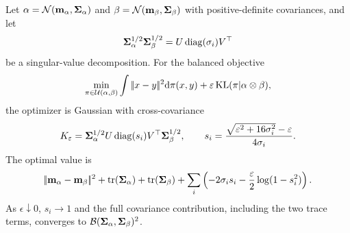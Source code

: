 \begin{prop}\label{prop-gaussian-sinkhorn-closed-form}
	Let $\alpha=\mathcal{N}(\mathbf{m}_\alpha,\mathbf{\Sigma}_\alpha)$ and $\beta=\mathcal{N}(\mathbf{m}_\beta,\mathbf{\Sigma}_\beta)$ with positive-definite covariances, and let
	\[
		\mathbf{\Sigma}_\alpha^{1/2}\mathbf{\Sigma}_\beta^{1/2}
		=
		U\operatorname{diag}(\sigma_i)V^\top
	\]
	be a singular-value decomposition. For the balanced objective
	\[
		\min_{\pi\in\mathcal{U}(\alpha,\beta)}
		\int|\!| x-y |\!|^2\mathrm{d}\pi(x,y)
		+
		\varepsilon\operatorname{KL}(\pi|\alpha\otimes\beta),
	\]
	the optimizer is Gaussian with cross-covariance
	\[
		K_\varepsilon
		=
		\mathbf{\Sigma}_\alpha^{1/2}
		U\operatorname{diag}(s_i)V^\top
		\mathbf{\Sigma}_\beta^{1/2},
		\qquad
		s_i
		=
		\frac{\sqrt{\varepsilon^2+16\sigma_i^2}-\varepsilon}{4\sigma_i}.
	\]
	The optimal value is
	\[
		|\!| \mathbf{m}_\alpha-\mathbf{m}_\beta |\!|^2
		+
		\operatorname{tr}(\mathbf{\Sigma}_\alpha)+\operatorname{tr}(\mathbf{\Sigma}_\beta)
		+
		\sum_i
		\left(
			-2\sigma_i s_i
			-\frac{\varepsilon}{2}\log(1-s_i^2)
		\right).
	\]
	As $\epsilon\downarrow0$, $s_i\to1$ and the full covariance contribution, including the two trace terms, converges to $\mathcal{B}(\mathbf{\Sigma}_\alpha,\mathbf{\Sigma}_\beta)^2$.
\end{prop}

